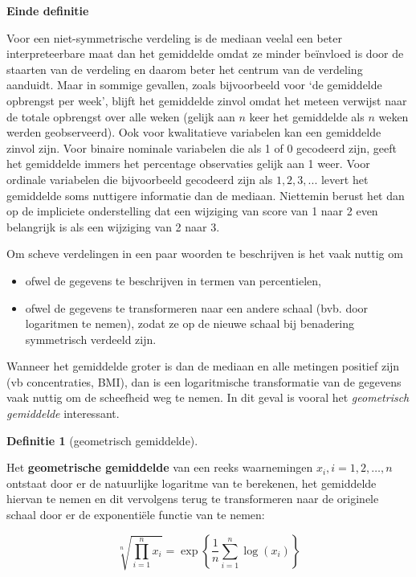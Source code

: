 \documentclass[
  12pt,dutch,coursenotes]{book}
\providecommand{\tightlist}{%
  \setlength{\itemsep}{0pt}\setlength{\parskip}{0pt}}
\theoremstyle{definition}
\newtheorem{definition}{Definitie}[chapter]
\theoremstyle{definition}
\theoremstyle{definition}
\theoremstyle{definition}
\theoremstyle{remark}
\begin{document}
\textbf{Einde definitie}

Voor een niet-symmetrische verdeling is de mediaan veelal een beter
interpreteerbare maat dan het gemiddelde omdat ze minder beïnvloed is
door de staarten van de verdeling en daarom beter het centrum van de
verdeling aanduidt. Maar in sommige gevallen, zoals bijvoorbeeld voor `de
gemiddelde opbrengst per week', blijft het gemiddelde zinvol omdat het
meteen verwijst naar de totale opbrengst over alle weken (gelijk aan \(n\)
keer het gemiddelde als \(n\) weken werden geobserveerd). Ook voor
kwalitatieve variabelen kan een gemiddelde zinvol zijn. Voor binaire
nominale variabelen die als 1 of 0 gecodeerd zijn, geeft het gemiddelde
immers het percentage observaties gelijk aan 1 weer. Voor ordinale
variabelen die bijvoorbeeld gecodeerd zijn als \(1, 2, 3, ...\) levert het
gemiddelde soms nuttigere informatie dan de mediaan. Niettemin berust het
dan op de impliciete onderstelling dat een wijziging van score van 1 naar 2
even belangrijk is als een wijziging van 2 naar 3.

Om scheve verdelingen in een paar woorden te beschrijven is het vaak nuttig
om

\begin{itemize}
\tightlist
\item
  ofwel de gegevens te beschrijven in termen van percentielen,
\item
  ofwel de gegevens te transformeren naar een andere schaal (bvb. door
  logaritmen te nemen), zodat ze op de nieuwe schaal bij benadering
  symmetrisch verdeeld zijn.
\end{itemize}

Wanneer het gemiddelde groter is dan de mediaan en alle metingen positief zijn (vb concentraties, BMI), dan is een logaritmische
transformatie van de gegevens vaak nuttig om de scheefheid weg te nemen. In
dit geval is vooral het \emph{geometrisch gemiddelde} interessant.

\begin{definition}[geometrisch gemiddelde]
\protect\hypertarget{def:unnamed-chunk-99}{}{\label{def:unnamed-chunk-99} {} }
\end{definition}
Het \textbf{geometrische gemiddelde} van een reeks waarnemingen \(x_i, i=1, 2, \dots, n\) ontstaat door er de natuurlijke logaritme van te berekenen, het
gemiddelde hiervan te nemen en dit vervolgens terug te transformeren naar de
originele schaal door er de exponentiële functie van te nemen:

\begin{equation*}
\sqrt[n]{\prod\limits_{i=1}^n x_i} = \exp\left\{\frac{1}{n} \sum_{i=1}^n \log(x_i)\right\}
\end{equation*}
\end{document}
